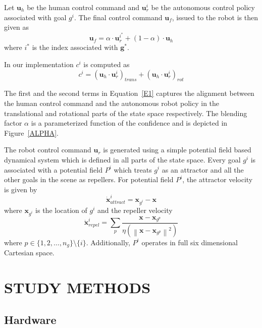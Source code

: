 \documentclass[conference]{IEEEtran}
\newcommand{\norm}[1]{\left\lVert#1\right\rVert}
\begin{document}
Let $\boldsymbol{u}_h$ be the human control command and $\boldsymbol{u}_{r}^{i}$ be the autonomous control policy associated with goal $g^i$. The final control command $\boldsymbol{u}_f$, issued to the robot is then given as 
\begin{equation*}
\boldsymbol{u}_f = \alpha\cdot \boldsymbol{u}_r^{i^*} + (1 - \alpha)\cdot \boldsymbol{u}_h
\end{equation*}
where $i^{*}$ is the index associated with $\boldsymbol{g}^{*}$.

In our implementation $c^i$ is computed as
\begin{equation}\label{E1}
c^i = (\boldsymbol{u}_h \cdot \boldsymbol{u}_r^i)_{trans} + (\boldsymbol{u}_h \cdot \boldsymbol{u}_r^i)_{rot}
\end{equation}

The first and the second terms in Equation~\ref{E1} captures the alignment between the human control command and the autonomous robot policy in the translational and rotational parts of the state space respectively. 
The blending factor $\alpha$ is a parameterized function of the confidence and is depicted in Figure~\ref{ALPHA}.

The robot control command $\boldsymbol{u}_r$ is generated using a simple potential field based dynamical system which is defined in all parts of the state space. Every goal $g^i$ is associated with a potential field $P^{i}$ which treats $g^i$ as an attractor and all the other goals in the scene as repellers. For potential field $P^i$, the attractor velocity is given by
\begin{equation*}
\dot{\boldsymbol{x}}^i_{attract} = \boldsymbol{x}_{g^i} - \boldsymbol{x}
\end{equation*}
where $\boldsymbol{x}_{g^i}$ is the location of $g^i$ and the repeller velocity
\begin{equation*}
\dot{\boldsymbol{x}}^i_{repel} = \sum_{p} \frac{\boldsymbol{x} - \boldsymbol{x}_{g^p}}{\eta(\norm{\boldsymbol{x} - \boldsymbol{x}_{g^p}}^2)}
\end{equation*}
where $p \in \{1,2,\dots,n_g\} \setminus \{i\}$. Additionally, $P^i$ operates in full six dimensional Cartesian space. 

\section{STUDY METHODS} \label{EXP}
\subsection{Hardware}
\end{document}
